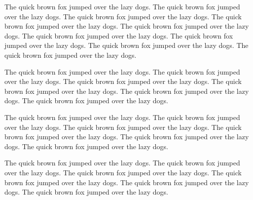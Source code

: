 \documentclass[12pt]{article}
\begin{document}
The quick brown fox jumped over the lazy dogs. The quick brown fox jumped over
the lazy dogs. The quick brown fox jumped over the lazy dogs. The quick brown
fox jumped over the lazy dogs. The quick brown fox jumped over the lazy dogs.
The quick brown fox jumped over the lazy dogs. The quick brown fox jumped over
the lazy dogs. The quick brown fox jumped over the lazy dogs. The quick brown
fox jumped over the lazy dogs.

The quick brown fox jumped over the lazy dogs. The quick brown fox jumped over
the lazy dogs. The quick brown fox jumped over the lazy dogs. The quick brown
fox jumped over the lazy dogs. The quick brown fox jumped over the lazy dogs.
The quick brown fox jumped over the lazy dogs.

\begin{schedule}%
\end{schedule}%

The quick brown fox jumped over the lazy dogs. The quick brown fox jumped over
the lazy dogs. The quick brown fox jumped over the lazy dogs. The quick brown
fox jumped over the lazy dogs. The quick brown fox jumped over the lazy dogs.
The quick brown fox jumped over the lazy dogs.

The quick brown fox jumped over the lazy dogs. The quick brown fox jumped over
the lazy dogs. The quick brown fox jumped over the lazy dogs. The quick brown
fox jumped over the lazy dogs. The quick brown fox jumped over the lazy dogs.
The quick brown fox jumped over the lazy dogs.
\end{document}

